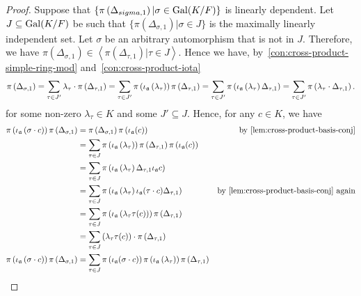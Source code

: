 \begin{proof}
  Suppose that $\{\pi\left(\Delta_{sigma, 1}\right)|\sigma\in\operatorname{Gal}(K/F)\}$ is linearly dependent. Let $J \subseteq \operatorname{Gal}(K/F)$ be such that $\{\pi\left(\Delta_{\sigma, 1}\right)|\sigma\in J\}$ is the maximally linearly independent set. Let $\sigma$ be an arbitrary automorphism that is not in $J$. Therefore, we have $\pi\left(\Delta_{\sigma, 1}\right) \in \left\langle \pi\left(\Delta_{\tau, 1}\right) | \tau\in J \right\rangle$. Hence we have, by~\cref{con:cross-product-simple-ring-mod} and~\cref{con:cross-product-iota}
  \[
    \pi\left(\Delta_{\sigma,1}\right) = \sum_{\tau\in J'}\lambda_{\tau}\cdot\pi\left(\Delta_{\tau, 1}\right) = \sum_{\tau\in J'}\pi\left(\iota_{\mathfrak{a}}\left(\lambda_{\tau}\right)\right)\pi\left(\Delta_{\tau, 1}\right) = \sum_{\tau\in J'}\pi\left(\iota_{\mathfrak{a}}\left(\lambda_{\tau}\right)\Delta_{\tau,1}\right) =\sum_{\tau\in J'}\pi\left(\lambda_{\tau}\cdot \Delta_{\tau, 1}\right).
  \]
  for some non-zero $\lambda_{\tau} \in K$ and some $J' \subseteq J$.
  Hence, for any $c \in K$, we have
  \[
    \begin{aligned}
      \pi\left(\iota_{\mfa}\left(\sigma \cdot c\right)\right) \pi\left(\Delta_{\sigma, 1}\right)
      &= \pi\left(\Delta_{\sigma, 1}\right)\pi\left(\iota_{\mfa}(c)\right) &\text{by~\cref{lem:cross-product-basis-conj}} \\
      &= \sum_{\tau\in J}
        \pi\left(\iota_{\mfa}\left(\lambda_{\tau}\right)\right)
        \pi\left(\Delta_{\tau, 1}\right)
        \pi\left(\iota_{\mfa}(c)\right)\\
      &= \sum_{\tau\in J}
        \pi\left(
        \iota_{\mfa}\left(\lambda_{\tau}\right)\Delta_{\tau, 1} \iota_{\mfa} c
        \right) \\
      &= \sum_{\tau\in J}
        \pi\left(
        \iota_{\mfa}\left(\lambda_{\tau}\right)\iota_{\mfa}(\tau\cdot c)\Delta_{\tau, 1}
        \right) & \text{by~\cref{lem:cross-product-basis-conj} again}\\
      &= \sum_{\tau\in J}
        \pi\left(\iota_{\mfa}\left(\lambda_{\tau}\tau(c)\right)\right)
        \pi\left(\Delta_{\tau,1}\right)\\
      &= \sum_{\tau\in J}
        \left(\lambda_{\tau}\tau(c)\right)\cdot \pi\left(\Delta_{\tau, 1}\right)\\
      \pi\left(\iota_{\mfa}\left(\sigma \cdot c\right)\right) \pi\left(\Delta_{\sigma, 1}\right)
      &= \sum_{\tau\in J}
        \pi\left(\iota_{\mfa}(\sigma\cdot c)\right)
        \pi\left(\iota_{\mfa}\left(\lambda_{\tau}\right)\right)
        \pi\left(\Delta_{\tau, 1}\right) \\

\end{aligned}\]
\end{proof}
